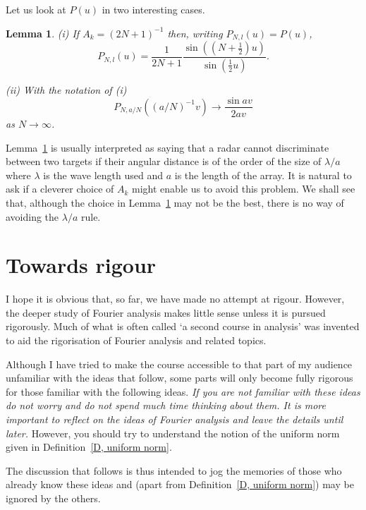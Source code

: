 \documentclass[12pt]{article}
\newtheorem{lemma}[theorem]{Lemma}
\theoremstyle{definition}
\begin{document}
Let us look at $P(u)$ in two interesting cases.
\begin{lemma}\label{discrimination}
(i) If $A_{k}=(2N+1)^{-1}$ then,
writing $P_{N,l}(u)=P(u)$,
\[P_{N,l}(u)=
\frac{1}{2N+1}\frac{\sin((N+\tfrac{1}{2})u)}{\sin(\tfrac{1}{2}u)}.\]

(ii) With the notation of (i)
\[P_{N,a/N}((a/N)^{-1}v)\rightarrow\frac{\sin av}{2av}\]
as $N\rightarrow\infty$.
\end{lemma}
Lemma~\ref{discrimination} is usually interpreted
as saying that a radar cannot discriminate between
two targets if their angular distance is of the
order of the size of $\lambda/a$ where $\lambda$
is the wave length used and $a$ is the length of the array.
It is natural to ask if a cleverer choice of $A_{k}$
might enable us to avoid this problem. We shall see
that, although the choice in Lemma~\ref{discrimination} may
not be the best, there is no way of avoiding
the $\lambda/a$ rule.
\section{Towards rigour} I hope it is obvious that, so far,
we have made no attempt at rigour. However, the deeper
study of Fourier analysis makes little sense unless it
is pursued rigorously. Much of what is often called
`a second course in analysis' was invented to aid the
rigorisation of  Fourier analysis and related topics.

Although I have tried to make the course accessible
to that part of my audience unfamiliar with the
ideas that follow, some parts will only become
fully rigorous for those familiar with the following ideas.
\emph{If you are not familiar with these ideas do
not worry and do not spend much time thinking about them.
It is more important to reflect on the ideas of Fourier
analysis and leave the details until later.} However,
you should try to understand the notion of the
uniform norm given in Definition~\ref{D, uniform norm}.

The discussion that follows is thus intended to jog
the memories of those who already know these ideas
and (apart from  Definition~\ref{D, uniform norm})
may be ignored by the others.
\end{document}
